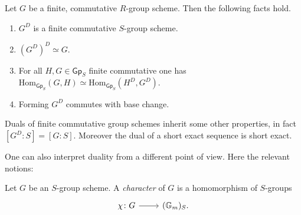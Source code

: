 \begin{thm}\label{thm:CartierDuality}
	Let $G$ be a finite, commutative $R$-group scheme.
	Then the following facts hold.
\begin{enumerate}
	\item $G^D$ is a finite commutative $S$-group scheme.
	\item $( G^D )^D \simeq G$.
	\item For all $H,G \in \mathsf{Gp}_S$ finite commutative one has
	$\mathrm{Hom}_{\mathsf{Gp}_S} \left( G, H \right) \simeq
	\mathrm{Hom}_{\mathsf{Gp}_S} \left( H^D, G^D \right)$.
	\item Forming $G^D$ commutes with base change.
\end{enumerate}
\end{thm}


\begin{rem}[]\label{rem:DualityOtherProperties}
	Duals of finite commutative group schemes inherit some other properties,
	in fact $[G^D : S] = [G : S]$.
	Moreover the dual of a short exact sequence is short exact.
\end{rem}


\noindent
One can also interpret duality from a different point of view.
Here the relevant notions:
\begin{defn}
	Let $G$ be an $S$-group scheme.
	A {\em character} of $G$ is a homomorphism of $S$-groups
	\begin{equation*}
	\begin{tikzcd}[row sep = 0ex
		,/tikz/column 1/.append style={anchor=base east}
		,/tikz/column 2/.append style={anchor=base west}]
		\chi\colon G \arrow[r, "", rightarrow] &
		(\mathbb{G}_m)_S
	.\end{tikzcd}
	\end{equation*} 
\end{defn}


